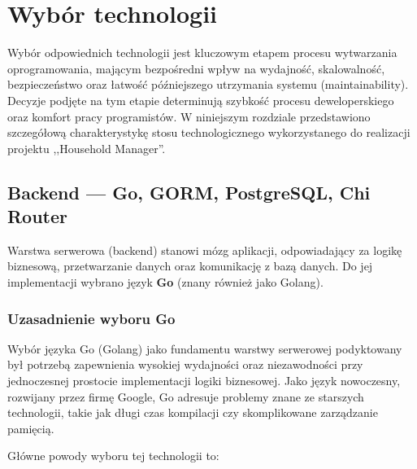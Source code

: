 \chapter{Wybór technologii}
\label{rozdzial3}

Wybór odpowiednich technologii jest kluczowym etapem procesu wytwarzania oprogramowania, mającym bezpośredni wpływ na wydajność, skalowalność, bezpieczeństwo oraz łatwość późniejszego utrzymania systemu (maintainability). Decyzje podjęte na tym etapie determinują szybkość procesu deweloperskiego oraz komfort pracy programistów. W niniejszym rozdziale przedstawiono szczegółową charakterystykę stosu technologicznego wykorzystanego do realizacji projektu ,,Household Manager''.

\section{Backend --- Go, GORM, PostgreSQL, Chi Router}

Warstwa serwerowa (backend) stanowi mózg aplikacji, odpowiadający za logikę biznesową, przetwarzanie danych oraz komunikację z bazą danych. Do jej implementacji wybrano język \textbf{Go} (znany również jako Golang).

\subsection{Uzasadnienie wyboru Go}

Wybór języka Go (Golang) jako fundamentu warstwy serwerowej podyktowany był potrzebą zapewnienia wysokiej wydajności oraz niezawodności przy jednoczesnej prostocie implementacji logiki biznesowej. Jako język nowoczesny, rozwijany przez firmę Google, Go adresuje problemy znane ze starszych technologii, takie jak długi czas kompilacji czy skomplikowane zarządzanie pamięcią.


Główne powody wyboru tej technologii to:

